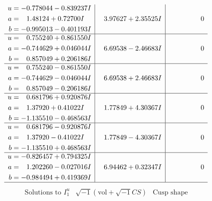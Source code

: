 \documentclass[1p]{elsarticle_modified}
\theoremstyle{definition}
\newcommand{\I}{\sqrt{-1}}
\begin{document}
$$\begin{array}{c|c|c}
\begin{aligned}
u &= -0.778044 - 0.839237 I \\
a &= \phantom{-}1.48124 + 0.72700 I \\
b &= -0.995013 - 0.401193 I\end{aligned}
 & \phantom{-}3.97627 + 2.35525 I & \phantom{-0.000000 } 0 \\ \hline\begin{aligned}
u &= \phantom{-}0.755240 + 0.861550 I \\
a &= -0.744629 + 0.046044 I \\
b &= \phantom{-}0.857049 + 0.206186 I\end{aligned}
 & \phantom{-}6.69538 - 2.46683 I & \phantom{-0.000000 } 0 \\ \hline\begin{aligned}
u &= \phantom{-}0.755240 - 0.861550 I \\
a &= -0.744629 - 0.046044 I \\
b &= \phantom{-}0.857049 - 0.206186 I\end{aligned}
 & \phantom{-}6.69538 + 2.46683 I & \phantom{-0.000000 } 0 \\ \hline\begin{aligned}
u &= \phantom{-}0.681796 + 0.920876 I \\
a &= \phantom{-}1.37920 + 0.41022 I \\
b &= -1.135510 - 0.468563 I\end{aligned}
 & \phantom{-}1.77849 + 4.30367 I & \phantom{-0.000000 } 0 \\ \hline\begin{aligned}
u &= \phantom{-}0.681796 - 0.920876 I \\
a &= \phantom{-}1.37920 - 0.41022 I \\
b &= -1.135510 + 0.468563 I\end{aligned}
 & \phantom{-}1.77849 - 4.30367 I & \phantom{-0.000000 } 0 \\ \hline\begin{aligned}
u &= -0.826457 + 0.794325 I \\
a &= \phantom{-}1.202260 - 0.027016 I \\
b &= -0.984494 + 0.419369 I\end{aligned}
 & \phantom{-}6.94462 + 0.32347 I & \phantom{-0.000000 } 0\\
 \hline 
 \end{array}$$\newpage$$\begin{array}{c|c|c}  
\text{Solutions to }I^u_{1}& \I (\text{vol} + \sqrt{-1}CS) & \text{Cusp shape}\\

\end{array}$$
\end{document}
